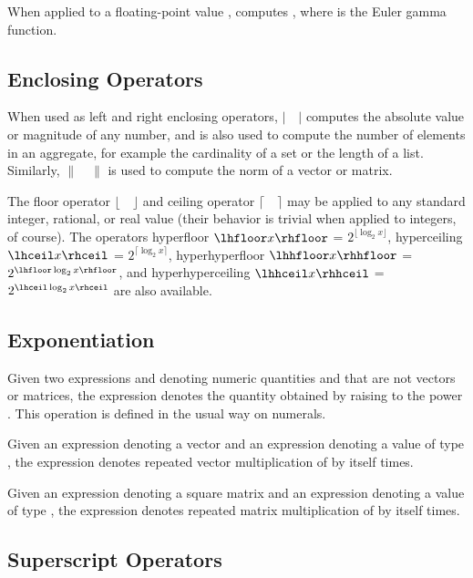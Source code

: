 When applied to a floating-point value ,  computes
, where \EXP{\Gamma} is the Euler gamma function.

\subsection{Enclosing Operators}

When used as left and right enclosing operators, $|\quad|$ computes the
absolute value or magnitude of any number, and is also used to compute
the number of elements in an aggregate, for example the cardinality
of a set or the length of a list.  Similarly, $\|\quad\|$ is used
to compute the norm of a vector or matrix.

The floor operator $\lfloor\quad\rfloor$ and ceiling operator
$\lceil\quad\rceil$
may be applied to any standard integer, rational, or real value (their behavior
is trivial when applied to integers, of course).  The operators
hyperfloor $\lhfloor x \rhfloor$ = $2^{\lfloor \log_2 x \rfloor}$,
hyperceiling $\lhceil x \rhceil$ = $2^{\lceil \log_2 x \rceil}$,
hyperhyperfloor $\lhhfloor x \rhhfloor$ = $2^{\lhfloor \log_2 x \rhfloor}$,
and hyperhyperceiling $\lhhceil x \rhhceil$ = $2^{\lhceil \log_2 x
  \rhceil}$ are also available.

\subsection{Exponentiation}
Given two expressions  and  denoting numeric quantities  and  that
are not vectors or matrices,
the expression  denotes the quantity obtained by raising  to the power .
This operation is defined in the usual way on numerals.

Given an expression  denoting a vector and an expression  denoting a value
of type , the expression  denotes repeated vector multiplication
of  by itself  times.

Given an expression  denoting a square matrix and an expression  denoting a value
of type , the expression  denotes repeated matrix multiplication
of  by itself  times.


\subsection{Superscript Operators}


